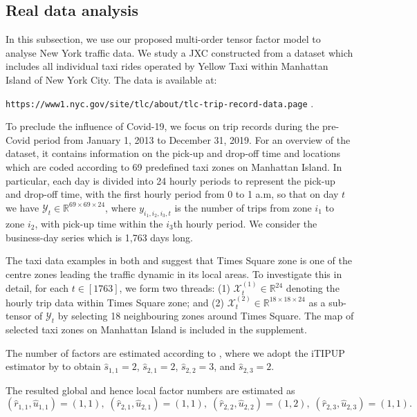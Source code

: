 \documentclass[aos]{imsart}
\theoremstyle{plain}
\theoremstyle{definition}
\def\wh#1{\widehat{#1}}
\def\R{\mathbb{R}}
\def\cX{\mathcal{X}}
\def\cY{\mathcal{Y}}
\begin{document}
\subsection{Real data analysis}
\label{subsec: real_data}

In this subsection, we use our proposed multi-order tensor factor model to analyse New York traffic data. We study a JXC constructed from a dataset which includes all individual taxi rides operated by Yellow Taxi within Manhattan Island of New York City. The data is available at:

{\small \texttt{https://www1.nyc.gov/site/tlc/about/tlc-trip-record-data.page}} .

To preclude the influence of Covid-19, we focus on trip records during the pre-Covid period from January 1, 2013 to December 31, 2019. For an overview of the dataset, it contains information on the pick-up and drop-off time and locations which are coded according to 69 predefined taxi zones on Manhattan Island. In particular, each day is divided into 24 hourly periods to represent the pick-up and drop-off time, with the first hourly period from 0  to 1 a.m, so that on day $t$ we have $\cY_t\in \R^{69\times 69\times 24}$, where $y_{i_1,i_2,i_3,t}$ is the number of trips from zone $i_1$ to zone $i_2$, with pick-up time within the $i_3$th hourly period.
We consider the business-day series which is 1,763 days long.




The taxi data examples in both \cite{Chenetal2022} and \cite{CenLam2025} suggest that Times Square zone is one of the centre zones leading the traffic dynamic in its local areas. To investigate this in detail, for each $t\in[1763]$, we form two threads: (1) $\cX_t^{(1)} \in\R^{24}$ denoting the hourly trip data within Times Square zone; and (2) $\cX_t^{(2)} \in \R^{18\times 18\times 24}$ as a sub-tensor of $\cY_t$ by selecting 18 neighbouring zones around Times Square. The map of selected taxi zones on Manhattan Island is included in the supplement.


The number of factors are estimated according to , where we adopt the iTIPUP estimator by \cite{Chenetal2022} to obtain $\wh{s}_{1,1} = 2$, $\wh{s}_{2,1} = 2$, $\wh{s}_{2,2} = 3$, and $\wh{s}_{2,3} = 2$.

The resulted global and hence local factor numbers are estimated as
\[
(\wh{r}_{1,1}, \wh{u}_{1,1}) =(1,1), \;
(\wh{r}_{2,1}, \wh{u}_{2,1}) =(1,1), \;
(\wh{r}_{2,2}, \wh{u}_{2,2}) =(1,2), \;
(\wh{r}_{2,3}, \wh{u}_{2,3}) =(1,1).
\]
\end{document}
